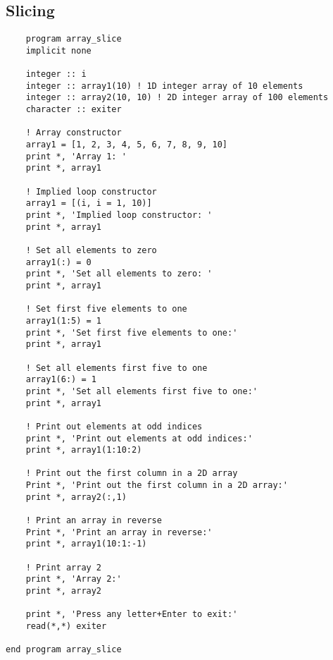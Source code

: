 \documentclass[]{article}
\begin{document}
\subsection{Slicing}
\begin{lstlisting}
    program array_slice
    implicit none

    integer :: i
    integer :: array1(10) ! 1D integer array of 10 elements
    integer :: array2(10, 10) ! 2D integer array of 100 elements
    character :: exiter

    ! Array constructor
    array1 = [1, 2, 3, 4, 5, 6, 7, 8, 9, 10]
    print *, 'Array 1: '
    print *, array1

    ! Implied loop constructor
    array1 = [(i, i = 1, 10)]
    print *, 'Implied loop constructor: '
    print *, array1

    ! Set all elements to zero
    array1(:) = 0
    print *, 'Set all elements to zero: '
    print *, array1

    ! Set first five elements to one
    array1(1:5) = 1
    print *, 'Set first five elements to one:'
    print *, array1

    ! Set all elements first five to one
    array1(6:) = 1
    print *, 'Set all elements first five to one:'
    print *, array1

    ! Print out elements at odd indices
    print *, 'Print out elements at odd indices:'
    print *, array1(1:10:2)

    ! Print out the first column in a 2D array
    Print *, 'Print out the first column in a 2D array:'
    print *, array2(:,1)

    ! Print an array in reverse
    Print *, 'Print an array in reverse:'
    print *, array1(10:1:-1)

    ! Print array 2
    print *, 'Array 2:'
    print *, array2

    print *, 'Press any letter+Enter to exit:'
    read(*,*) exiter

end program array_slice
\end{lstlisting}
    
\end{document}
